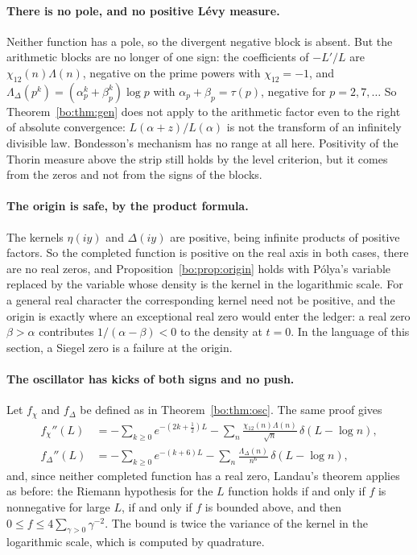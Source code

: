 \paragraph{There is no pole, and no positive L\'evy measure.} Neither function has a pole, so the divergent negative block is absent. But the arithmetic blocks are no longer of one sign: the coefficients of $-L'/L$ are $\chi_{12}(n)\Lambda(n)$, negative on the prime powers with $\chi_{12}=-1$, and $\Lambda_\Delta(p^k)=(\alpha_p^k+\beta_p^k)\log p$ with $\alpha_p+\beta_p=\tau(p)$, negative for $p=2,7,\dots$ So Theorem~\ref{bo:thm:gen} does not apply to the arithmetic factor even to the right of absolute convergence: $L(\alpha+z)/L(\alpha)$ is not the transform of an infinitely divisible law. Bondesson's mechanism has no range at all here. Positivity of the Thorin measure above the strip still holds by the level criterion, but it comes from the zeros and not from the signs of the blocks.

\paragraph{The origin is safe, by the product formula.} The kernels $\eta(iy)$ and $\Delta(iy)$ are positive, being infinite products of positive factors. So the completed function is positive on the real axis in both cases, there are no real zeros, and Proposition~\ref{bo:prop:origin} holds with P\'olya's variable replaced by the variable whose density is the kernel in the logarithmic scale. For a general real character the corresponding kernel need not be positive, and the origin is exactly where an exceptional real zero would enter the ledger: a real zero $\beta>\alpha$ contributes $1/(\alpha-\beta)<0$ to the density at $t=0$. In the language of this section, a Siegel zero is a failure at the origin.

\paragraph{The oscillator has kicks of both signs and no push.} Let $f_\chi$ and $f_\Delta$ be defined as in Theorem~\ref{bo:thm:osc}. The same proof gives
\begin{align*}
f_\chi''(L)&=-\sum_{k\ge0}e^{-(2k+\frac12)L}-\sum_n\frac{\chi_{12}(n)\Lambda(n)}{\sqrt n}\,\delta(L-\log n),\\
f_\Delta''(L)&=-\sum_{k\ge0}e^{-(k+6)L}-\sum_n\frac{\Lambda_\Delta(n)}{n^{6}}\,\delta(L-\log n),
\end{align*}
and, since neither completed function has a real zero, Landau's theorem applies as before: the Riemann hypothesis for the $L$ function holds if and only if $f$ is nonnegative for large $L$, if and only if $f$ is bounded above, and then $0\le f\le4\sum_{\gamma>0}\gamma^{-2}$. The bound is twice the variance of the kernel in the logarithmic scale, which is computed by quadrature.

